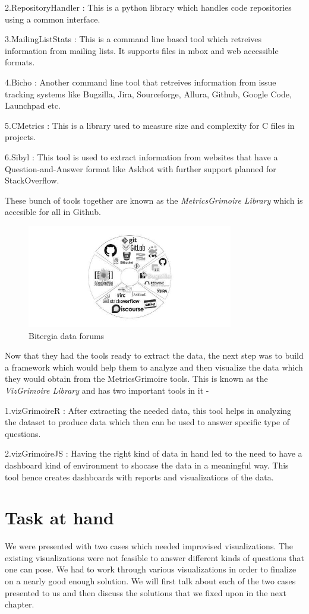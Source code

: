 \documentclass[double,12pt]{beavtex}
\begin{document}
2.RepositoryHandler : This is a python library which handles code repositories using a common interface.

3.MailingListStats : This is a command line based tool which retreives information from mailing lists. It supports files in mbox and web accessible formats.

4.Bicho : Another command line tool that retreives information from issue tracking systems like Bugzilla, Jira, Sourceforge, Allura, Github, Google Code, Launchpad etc.

5.CMetrics : This is a library used to measure size and complexity for C files in projects.

6.Sibyl : This tool is used to extract information from websites that have a Question-and-Answer format like Askbot with further support planned for StackOverflow.

These bunch of tools together are known as the \emph{MetricsGrimoire Library} which is accesible for all in Github.

\begin{figure}[!ht]
\centering
\includegraphics[width=90mm]{bitergia.jpg}
\caption{Bitergia data forums}
\end{figure}

Now that they had the tools ready to extract the data, the next step was to build a framework which would help them to analyze and then visualize the data which they would obtain from the MetricsGrimoire tools. This is known as the \emph{VizGrimoire Library} and has two important tools in it -

1.vizGrimoireR : After extracting the needed data, this tool helps in analyzing the dataset to produce data which then can be used to answer specific type of questions.

2.vizGrimoireJS : Having the right kind of data in hand led to the need to have a dashboard kind of environment to shocase the data in a meaningful way. This tool hence creates dashboards with reports and visualizations of the data.

\section{Task at hand}
We were presented with two cases which needed improvised visualizations. The existing visualizations were not feasible to answer different kinds of questions that one can pose. We had to work through various visualizations in order to finalize on a nearly good enough solution. We will first talk about each of the two cases presented to us and then discuss the solutions that we fixed upon in the next chapter.
\end{document}
